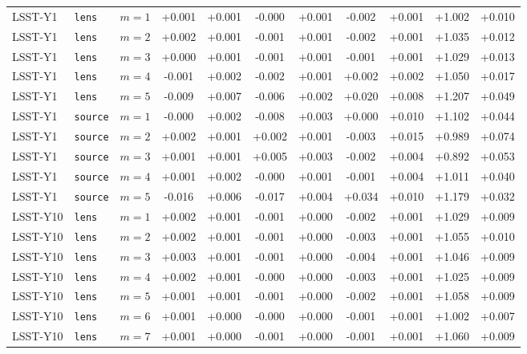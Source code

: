 \begin{table}
\begin{threeparttable}
\begin{tabular}{llccccccccc}
      \midrule
      LSST-Y1 & \texttt{lens} & \(m=1\) & +0.001 & +0.001 & -0.000 & +0.001 & -0.002 & +0.001 & +1.002 & +0.010 \\
      LSST-Y1 & \texttt{lens} & \(m=2\) & +0.002 & +0.001 & -0.001 & +0.001 & -0.002 & +0.001 & +1.035 & +0.012 \\
      LSST-Y1 & \texttt{lens} & \(m=3\) & +0.000 & +0.001 & -0.001 & +0.001 & -0.001 & +0.001 & +1.029 & +0.013 \\
      LSST-Y1 & \texttt{lens} & \(m=4\) & -0.001 & +0.002 & -0.002 & +0.001 & +0.002 & +0.002 & +1.050 & +0.017 \\
      LSST-Y1 & \texttt{lens} & \(m=5\) & -0.009 & +0.007 & -0.006 & +0.002 & +0.020 & +0.008 & +1.207 & +0.049 \\
      \midrule
      LSST-Y1 & \texttt{source} & \(m=1\) & -0.000 & +0.002 & -0.008 & +0.003 & +0.000 & +0.010 & +1.102 & +0.044 \\
      LSST-Y1 & \texttt{source} & \(m=2\) & +0.002 & +0.001 & +0.002 & +0.001 & -0.003 & +0.015 & +0.989 & +0.074 \\
      LSST-Y1 & \texttt{source} & \(m=3\) & +0.001 & +0.001 & +0.005 & +0.003 & -0.002 & +0.004 & +0.892 & +0.053 \\
      LSST-Y1 & \texttt{source} & \(m=4\) & +0.001 & +0.002 & -0.000 & +0.001 & -0.001 & +0.004 & +1.011 & +0.040 \\
      LSST-Y1 & \texttt{source} & \(m=5\) & -0.016 & +0.006 & -0.017 & +0.004 & +0.034 & +0.010 & +1.179 & +0.032 \\
      \midrule
      LSST-Y10 & \texttt{lens} & \(m=1\)  & +0.002 & +0.001 & -0.001 & +0.000 & -0.002 & +0.001 & +1.029 & +0.009 \\
      LSST-Y10 & \texttt{lens} & \(m=2\)  & +0.002 & +0.001 & -0.001 & +0.000 & -0.003 & +0.001 & +1.055 & +0.010 \\
      LSST-Y10 & \texttt{lens} & \(m=3\)  & +0.003 & +0.001 & -0.001 & +0.000 & -0.004 & +0.001 & +1.046 & +0.009 \\
      LSST-Y10 & \texttt{lens} & \(m=4\)  & +0.002 & +0.001 & -0.000 & +0.000 & -0.003 & +0.001 & +1.025 & +0.009 \\
      LSST-Y10 & \texttt{lens} & \(m=5\)  & +0.001 & +0.001 & -0.001 & +0.000 & -0.002 & +0.001 & +1.058 & +0.009 \\
      LSST-Y10 & \texttt{lens} & \(m=6\)  & +0.001 & +0.000 & -0.000 & +0.000 & -0.001 & +0.001 & +1.002 & +0.007 \\
      LSST-Y10 & \texttt{lens} & \(m=7\)  & +0.001 & +0.000 & -0.001 & +0.000 & -0.001 & +0.001 & +1.060 & +0.009 \\

\end{tabular}
\end{threeparttable}
\end{table}
